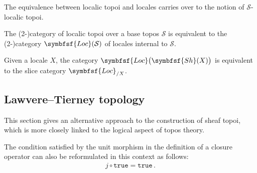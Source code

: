     The equivalence between localic topoi and locales carries over to the notion of $\mathcal{S}$-localic topoi.
    \begin{property}
        The (2-)category of localic topoi over a base topos $\mathcal{S}$ is equivalent to the (2-)category $\symbfsf{Loc}(\mathcal{S})$ of locales internal to $\mathcal{S}$.
    \end{property}
    \begin{property}\label{topos:slice_locale}
        Given a locale $X$, the category $\symbfsf{Loc}\bigl(\symbfsf{Sh}(X)\bigr)$ is equivalent to the slice category $\symbfsf{Loc}_{/X}$.
    \end{property}

\subsection{Lawvere--Tierney topology}

    This section gives an alternative approach to the construction of sheaf topoi, which is more closely linked to the logical aspect of topos theory.

    \begin{remark}
        The condition satisfied by the unit morphism in the definition of a closure operator can also be reformulated in this context as follows:
        \begin{gather}
            j\circ\texttt{true} = \texttt{true}\,.
        \end{gather}
    \end{remark}

